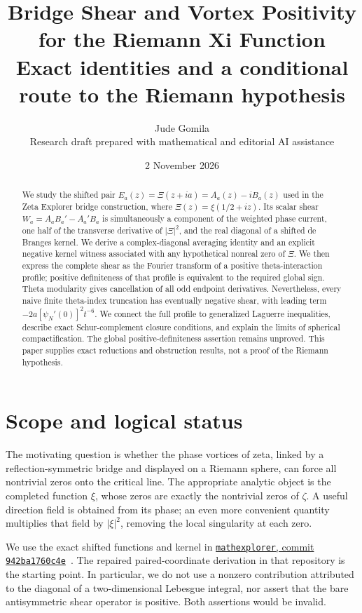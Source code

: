 \documentclass[11pt,letterpaper]{article}
\title{\textbf{Bridge Shear and Vortex Positivity\\for the Riemann Xi Function}\\[0.5em]\large Exact identities and a conditional route to the Riemann hypothesis}
\author{Jude Gomila\\[0.2em]\small Research draft prepared with mathematical and editorial AI assistance}
\date{2 November 2026}
\numberwithin{equation}{section}
\theoremstyle{definition}
\theoremstyle{remark}
\newcommand{\repo}{\href{https://github.com/judegomila/mathexplorer/tree/942ba1760c4ef54a519750ab91c37a661c31e0ce}{\texttt{mathexplorer}, commit \texttt{942ba1760c4e}}}
\begin{document}
\maketitle
\begin{abstract}
We study the shifted pair $E_a(z)=\Xi(z+ia)=A_a(z)-iB_a(z)$ used in the Zeta Explorer bridge construction, where $\Xi(z)=\xi(1/2+iz)$. Its scalar shear $W_a=A_aB_a'-A_a'B_a$ is simultaneously a component of the weighted phase current, one half of the transverse derivative of $|\Xi|^2$, and the real diagonal of a shifted de Branges kernel. We derive a complex-diagonal averaging identity and an explicit negative kernel witness associated with any hypothetical nonreal zero of $\Xi$. We then express the complete shear as the Fourier transform of a positive theta-interaction profile; positive definiteness of that profile is equivalent to the required global sign. Theta modularity gives cancellation of all odd endpoint derivatives. Nevertheless, every naive finite theta-index truncation has eventually negative shear, with leading term $-2a[\psi_N'(0)]^2t^{-6}$. We connect the full profile to generalized Laguerre inequalities, describe exact Schur-complement closure conditions, and explain the limits of spherical compactification. The global positive-definiteness assertion remains unproved. This paper supplies exact reductions and obstruction results, not a proof of the Riemann hypothesis.
\end{abstract}

\section{Scope and logical status}
The motivating question is whether the phase vortices of zeta, linked by a reflection-symmetric bridge and displayed on a Riemann sphere, can force all nontrivial zeros onto the critical line. The appropriate analytic object is the completed function $\xi$, whose zeros are exactly the nontrivial zeros of $\zeta$. A useful direction field is obtained from its phase; an even more convenient quantity multiplies that field by $|\xi|^2$, removing the local singularity at each zero.

We use the exact shifted functions and kernel in \repo\ \cite{repo}. The repaired paired-coordinate derivation in that repository is the starting point. In particular, we do not use a nonzero contribution attributed to the diagonal of a two-dimensional Lebesgue integral, nor assert that the bare antisymmetric shear operator is positive. Both assertions would be invalid.
\end{document}
